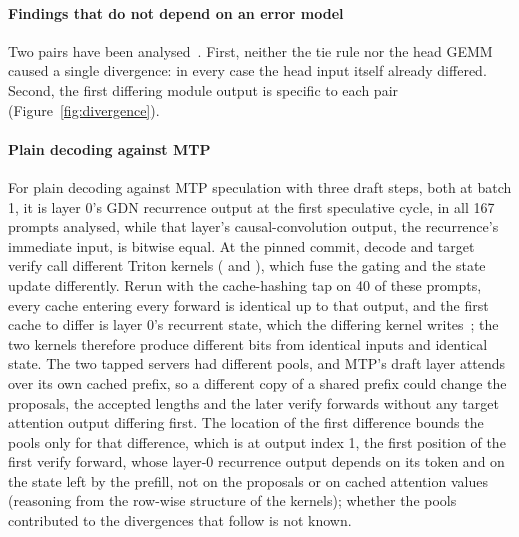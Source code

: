 \paragraph{Findings that do not depend on an error model} Two pairs have been analysed~. First, neither the tie rule nor the head GEMM caused a single divergence: in every case the head input itself already differed. Second, the first differing module output is specific to each pair (Figure~\ref{fig:divergence}).

\paragraph{Plain decoding against MTP} For plain decoding against MTP speculation with three draft steps, both at batch 1, it is layer 0's GDN recurrence output at the first speculative cycle, in all 167 prompts analysed, while that layer's causal-convolution output, the recurrence's immediate input, is bitwise equal. At the pinned commit, decode and target verify call different Triton kernels ( and ), which fuse the gating and the state update differently. Rerun with the cache-hashing tap on 40 of these prompts, every cache entering every forward is identical up to that output, and the first cache to differ is layer 0's recurrent state, which the differing kernel writes~; the two kernels therefore produce different bits from identical inputs and identical state. The two tapped servers had different pools, and MTP's draft layer attends over its own cached prefix, so a different copy of a shared prefix could change the proposals, the accepted lengths and the later verify forwards without any target attention output differing first. The location of the first difference bounds the pools only for that difference, which is at output index 1, the first position of the first verify forward, whose layer-0 recurrence output depends on its token and on the state left by the prefill, not on the proposals or on cached attention values (reasoning from the row-wise structure of the kernels); whether the pools contributed to the divergences that follow is not known.

